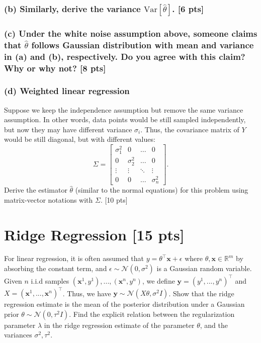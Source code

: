 \documentclass[twoside,10pt]{article}
\begin{document}
\subsubsection*{(b) Similarly, derive the variance $\text{Var}[\hat{\theta}]$. [6 pts]}

\subsubsection*{(c) Under the white noise assumption above, someone claims that $\hat{\theta}$ follows Gaussian
distribution with mean and variance in (a) and (b), respectively. Do
you agree with this claim? Why or why not? [8 pts]}

\subsubsection*{(d) Weighted linear regression}

Suppose we keep the independence assumption but
remove the same variance assumption. In other words, data points would be
still sampled independently, but now they may have different
variance $\sigma_i$. Thus, the covariance matrix of $Y$ would be still
diagonal, but with different values:
\begin{equation}
\Sigma = \begin{bmatrix}
\sigma_1^2 & 0 & \dots & 0\\
0 & \sigma_2^2& \dots & 0\\
\vdots & \vdots & \ddots & \vdots\\
0 & 0 & \dots & \sigma_n^2
\end{bmatrix}.
\end{equation}
Derive the estimator $\hat{\theta}$ (similar to the normal equations) for this problem using matrix-vector
notations with $\Sigma$. [10 pts]

\vspace{1cm}


\section{Ridge Regression [15 pts]}

For linear regression, it is often assumed that $y = \theta^\top \textbf{x} + \epsilon$ where $\theta, \textbf{x} \in \mathbb{R}^m$ by absorbing the constant term, and $\epsilon \sim \mathcal{N} (0, \sigma^2)$ is a Gaussian random variable. Given $n$ i.i.d samples $(\textbf{x}^1, y^1), ..., (\textbf{x}^n, y^n)$, we define $\textbf{y} = (y^1, ..., y^n)^\top$ and $X = (\textbf{x}^1, ..., \textbf{x}^n)^\top$. Thus, we have $\textbf{y} \sim \mathcal{N} (X\theta, \sigma^2 I)$. Show that the ridge regression estimate is the mean of the posterior distribution under a Gaussian prior $\theta \sim \mathcal{N} (0, \tau^2 I)$. Find the explicit relation between the regularization parameter $\lambda$ in the ridge regression estimate of the parameter $\theta$, and the variances $\sigma^2, \tau^2$.
\end{document}

